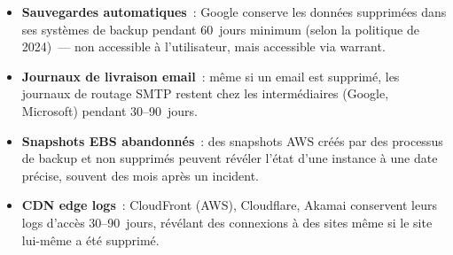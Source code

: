 \begin{itemize}
    \item \textbf{Sauvegardes automatiques}~: Google conserve les données
          supprimées dans ses systèmes de backup pendant 60~jours minimum
          (selon la politique de 2024)~--- non accessible à l'utilisateur,
          mais accessible via warrant.
    \item \textbf{Journaux de livraison email}~: même si un email est
          supprimé, les journaux de routage SMTP restent chez les
          intermédiaires (Google, Microsoft) pendant 30--90~jours.
    \item \textbf{Snapshots EBS abandonnés}~: des snapshots AWS créés
          par des processus de backup et non supprimés peuvent révéler
          l'état d'une instance à une date précise, souvent des mois
          après un incident.
    \item \textbf{CDN edge logs}~: CloudFront (AWS), Cloudflare, Akamai
          conservent leurs logs d'accès 30--90~jours, révélant
          des connexions à des sites même si le site lui-même a été
          supprimé.
\end{itemize}

\separateur

